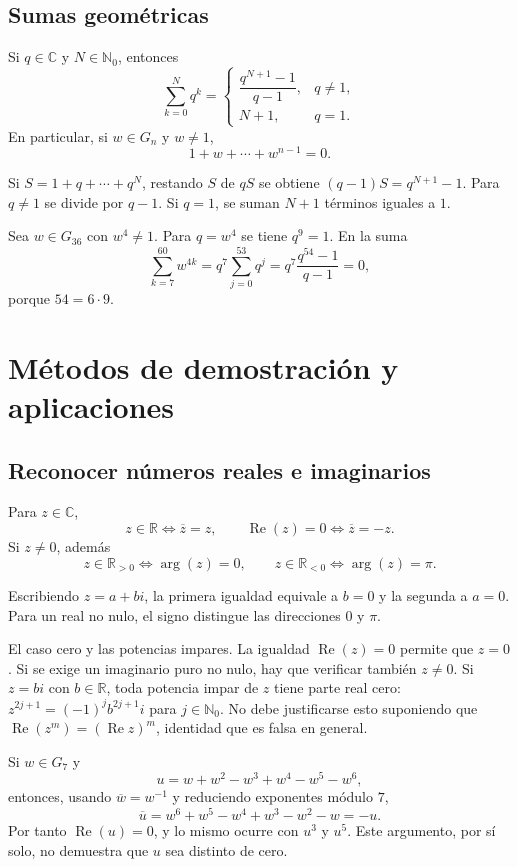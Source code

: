 \subsection{Sumas geométricas}
\begin{proposicion}[{title={Suma geométrica finita}}]
Si $q\in\mathbb C$ y $N\in\mathbb N_0$, entonces
\[
\sum_{k=0}^{N}q^k=
\begin{cases}
\dfrac{q^{N+1}-1}{q-1},&q\neq1,\\[4pt]
N+1,&q=1.
\end{cases}
\]
En particular, si $w\in G_n$ y $w\neq1$,
\[
1+w+\cdots+w^{n-1}=0.
\]
\end{proposicion}
\begin{demostracion}
Si $S=1+q+\cdots+q^N$, restando $S$ de $qS$ se obtiene
$(q-1)S=q^{N+1}-1$. Para $q\neq1$ se divide por $q-1$.
Si $q=1$, se suman $N+1$ términos iguales a $1$.
\end{demostracion}

\begin{ejemplo}
Sea $w\in G_{36}$ con $w^4\neq1$. Para $q=w^4$ se tiene $q^9=1$.
En la suma
\[
\sum_{k=7}^{60}w^{4k}=q^7\sum_{j=0}^{53}q^j
=q^7\frac{q^{54}-1}{q-1}=0,
\]
porque $54=6\cdot9$.
\end{ejemplo}
\section{Métodos de demostración y aplicaciones}
\subsection{Reconocer números reales e imaginarios}
\begin{proposicion}
Para $z\in\mathbb C$,
\[
z\in\mathbb R\iff\overline z=z,
\qquad
\operatorname{Re}(z)=0\iff\overline z=-z.
\]
Si $z\neq0$, además
\[
z\in\mathbb R_{>0}\iff\arg(z)=0,
\qquad
z\in\mathbb R_{<0}\iff\arg(z)=\pi.
\]
\end{proposicion}
\begin{demostracion}
Escribiendo $z=a+bi$, la primera igualdad equivale a $b=0$ y la
segunda a $a=0$. Para un real no nulo, el signo distingue las direcciones
$0$ y $\pi$.
\end{demostracion}
\begin{nota}{El caso cero y las potencias impares.}
La igualdad $\operatorname{Re}(z)=0$ permite que $z=0$.
Si se exige un imaginario puro no nulo, hay que verificar también $z\neq0$.
Si $z=bi$ con $b\in\mathbb R$, toda potencia impar de $z$ tiene parte real
cero: $z^{2j+1}=(-1)^jb^{2j+1}i$ para $j\in\mathbb N_0$.
No debe justificarse esto suponiendo que
$\operatorname{Re}(z^m)=(\operatorname{Re}z)^m$, identidad que es falsa en general.
\end{nota}
\begin{ejemplo}
Si $w\in G_7$ y
\[
u=w+w^2-w^3+w^4-w^5-w^6,
\]
entonces, usando $\overline w=w^{-1}$ y reduciendo exponentes módulo $7$,
\[
\overline u=w^6+w^5-w^4+w^3-w^2-w=-u.
\]
Por tanto $\operatorname{Re}(u)=0$, y lo mismo ocurre con $u^3$ y $u^5$.
Este argumento, por sí solo, no demuestra que $u$ sea distinto de cero.
\end{ejemplo}
